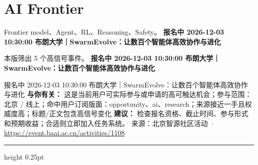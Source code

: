 \documentclass[10.5pt]{ctexart}
\begin{document}
\section*{AI Frontier}
{\color{ormuted} Frontier model、Agent、RL、Reasoning、Safety。}
\vspace{2mm}
{\LARGE\bfseries 报名中 2026-12-03 10:30:00 布朗大学｜SwarmEvolve：让数百个智能体高效协作与进化}\par
\vspace{1mm}
{\color{ormuted} 本版筛出 5 个高信号事件。}
\vspace{3mm}
{\Large\bfseries 报名中 2026-12-03 10:30:00 布朗大学｜SwarmEvolve：让数百个智能体高效协作与进化}\par
报名中 2026-12-03 10:30:00 布朗大学｜SwarmEvolve：让数百个智能体高效协作与进化
\textbf{与你有关：} 这是当前用户可实际参与或申请的高可触达机会；参与范围：北京 / 线上；命中用户订阅版面：opportunity、ai、research；来源接近一手且权威度高；标题/正文包含高信号变化
\textbf{建议：} 检查报名资格、截止时间、参与形式和预期收益；合适则立即加入任务系统。
{\footnotesize\color{ormuted} 来源：北京智源社区活动 · \url{https://event.baai.ac.cn/activities/1108}}
\vspace{4mm}
\hrule height 0.25pt
\vspace{3mm}
\end{document}
